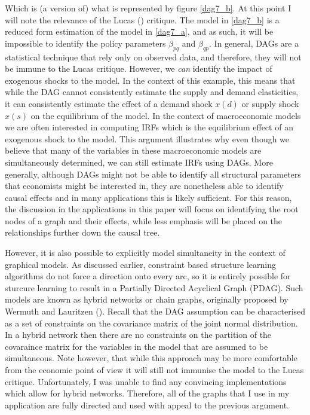 \documentclass{article}
\begin{document}
Which is (a version of) what is represented by figure \ref{dag7_b}. At this point I will note the relevance of the Lucas (\citeyear{lucas1976econometric}) critique. The model in \ref{dag7_b} is a reduced form estimation of the model in \ref{dag7_a}, and as such, it will be impossible to identify the policy parameters $\beta_{pq}$ and $\beta_{qp}$. In general, DAGs are a statistical technique that rely only on observed data, and therefore, they will not be immune to the Lucas critique. However, we \textit{can} identify the impact of exogenous shocks to the model. In the context of this example, this means that while the DAG cannot consistently estimate the supply and demand elasticities, it can consistently estimate the effect of a demand shock $x(d)$ or supply shock $x(s)$ on the equilibrium of the model. In the context of macroeconomic models we are often interested in computing IRFs which is the equilibrium effect of an exogenous shock to the model. This argument illustrates why even though we believe that many of the variables in these macroeconomic models are simultaneously determined, we can still estimate IRFs using DAGs. More generally, although DAGs might not be able to identify all structural parameters that economists might be interested in, they are nonetheless able to identify causal effects and in many applications this is likely sufficient. For this reason, the discussion in the applications in this paper will focus on identifying the root nodes of a graph and their effects, while less emphasis will be placed on the relationships further down the causal tree.

However, it is also possible to explicitly model simultaneity in the context of graphical models. As discussed earlier, constraint based structure learning algorithms do not force a direction onto every arc, so it is entirely possible for sturcure learning to result in a Partially Directed Acyclical Graph (PDAG). Such models are known as hybrid networks or chain graphs, originally proposed by Wermuth and Lauritzen (\citeyear{wermuth1990substantive}). Recall that the DAG assumption can be characterised as a set of constraints on the covariance matrix of the joint normal distribution. In a hybrid network then there are no constraints on the partition of the covaraince matrix for the variables in the model that are assumed to be simultaneous. Note however, that while this approach may be more comfortable from the economic point of view it will still not immunise the model to the Lucas critique. Unfortunately, I was unable to find any convincing implementations which allow for hybrid networks. Therefore, all of the graphs that I use in my application are fully directed and used with appeal to the previous argument.
\end{document}
